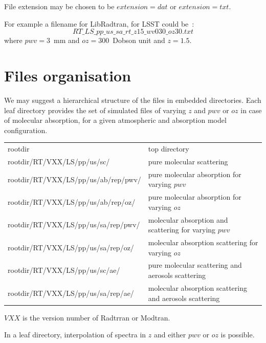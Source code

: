 \documentclass[a4paper]{article}
\begin{document}
File extension may be chosen to be $extension=dat$ or $extension=txt$.

For example a filename for LibRadtran, for LSST could be~:
\begin{equation}
RT\_LS\_pp\_us\_sa\_rt\_z15\_wv030\_oz30.txt  \nonumber
\end{equation}
where $pwv=3$~mm and $oz=300$~Dobson unit and $z=1.5$.


\section{Files organisation}
We may suggest a hierarchical structure  of the files in embedded directories.
Each leaf directory provides the set of simulated files of varying $z$ and $pwv$ or $oz$ in case of molecular absorption, for a given atmospheric and absorption model configuration.

\begin{table}[h]
{\small
\begin{tabular}{ l l}
  rootdir &  top directory \\
 rootdir/RT/VXX/LS/pp/us/sc/ & pure molecular scattering \\
 rootdir/RT/VXX/LS/pp/us/ab/rep/pwv/ & pure molecular absorption for varying $pwv$ \\
 rootdir/RT/VXX/LS/pp/us/ab/rep/oz/ & pure molecular absorption for varying $oz$ \\
 rootdir/RT/VXX/LS/pp/us/sa/rep/pwv/ & molecular absorption and scattering for varying $pwv$ \\
 rootdir/RT/VXX/LS/pp/us/sa/rep/oz/ & molecular absorption scattering for varying $oz$ \\
 rootdir/RT/VXX/LS/pp/us/sc/ae/ & pure molecular scattering and aerosols scattering \\
 rootdir/RT/VXX/LS/pp/us/sa/rep/ae/ & molecular absorption scattering and aerosols scattering \\
\end{tabular}
}
\end{table}
$VXX$ is the version number of Radtrran or Modtran.

In a leaf directory, interpolation of spectra in $z$ and either $pwv$ or $oz$ is possible.


\newpage
\appendix
\end{document}
